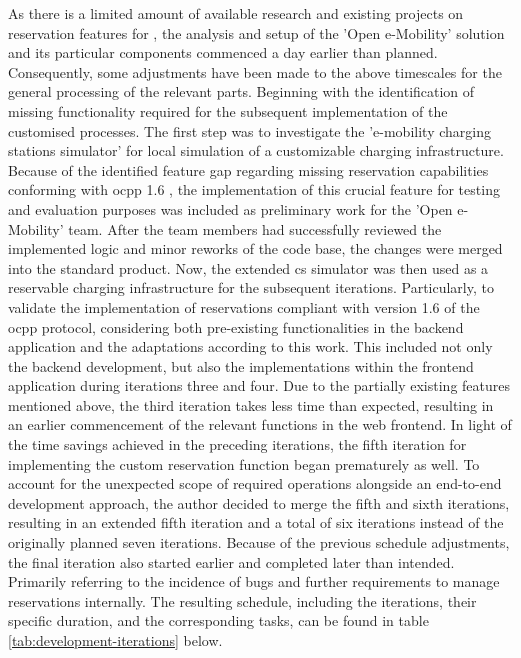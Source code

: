 As there is a limited amount of available research and existing projects on reservation features for , the analysis and setup of the 'Open e-Mobility' \cite{noauthor_open_2023} solution and its particular components commenced a day earlier than planned.
Consequently, some adjustments have been made to the above timescales for the general processing of the relevant parts.
Beginning with the identification of missing functionality required for the subsequent implementation of the customised processes.
The first step was to investigate the 'e-mobility charging stations simulator' \cite{noauthor_julianhbuechere-mobility-charging-stations-simulator_nodate} for local simulation of a customizable charging infrastructure.
Because of the identified feature gap regarding missing reservation capabilities conforming with \acrshort{ocpp} 1.6 \cite{noauthor_ocpp_nodate-1}, the implementation of this crucial feature for testing and evaluation purposes was included as preliminary work for the 'Open e-Mobility' team.
After the team members had successfully reviewed the implemented logic and minor reworks of the code base, the changes were merged into the standard product.
Now, the extended \acrshort{cs} simulator was then used as a reservable charging infrastructure for the subsequent iterations.
Particularly, to validate the implementation of reservations compliant with version 1.6 of the \acrshort{ocpp} protocol, considering both pre-existing functionalities in the backend application and the adaptations according to this work.
This included not only the backend development, but also the implementations within the frontend application during iterations three and four.
Due to the partially existing features mentioned above, the third iteration takes less time than expected, resulting in an earlier commencement of the relevant functions in the web frontend.
In light of the time savings achieved in the preceding iterations, the fifth iteration for implementing the custom reservation function began prematurely as well. 
To account for the unexpected scope of required operations alongside an end-to-end development approach, the author decided to merge the fifth and sixth iterations, resulting in an extended fifth iteration and a total of six iterations instead of the originally planned seven iterations.
Because of the previous schedule adjustments, the final iteration also started earlier and completed later than intended. 
Primarily referring to the incidence of bugs and further requirements to manage reservations internally.
The resulting schedule, including the iterations, their specific duration, and the corresponding tasks, can be found in table \ref{tab:development-iterations} below.

